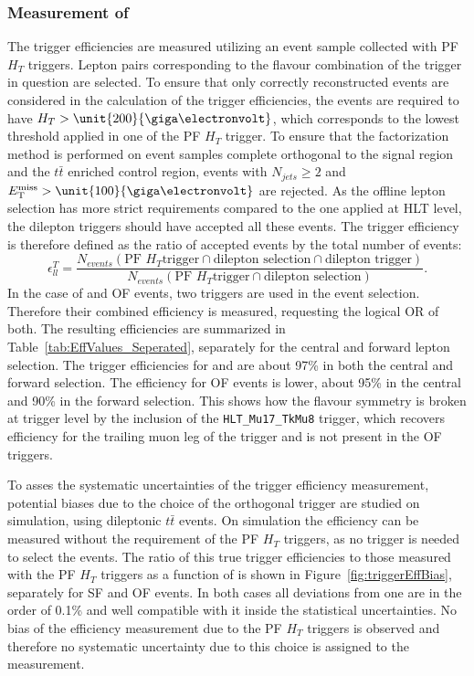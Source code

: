 \subsubsection{Measurement of \RT}
\label{sec:triggerEffs}
The trigger efficiencies are measured utilizing an event sample collected with PF $H_T$ triggers. Lepton pairs corresponding to the flavour combination of the trigger in question are selected. To ensure that only correctly reconstructed events are considered in the calculation of the trigger efficiencies, the events are required to have $H_T > \unit{200}{\giga\electronvolt}$, which corresponds to the lowest threshold applied in one of the PF $H_T$ trigger. To ensure that the factorization method is performed on event samples complete orthogonal to the signal region and the $t\bar{t}$ enriched control region, events with $N_{jets} \geq 2$ and $\MET > \unit{100}{\giga\electronvolt}$ are rejected. As the offline lepton selection has more strict requirements compared to the one applied at HLT level, the dilepton triggers should have accepted all these events. The trigger efficiency is therefore defined as the ratio of accepted events by the total number of events:
\begin{equation}
\epsilon_{ll}^T = \frac{N_{events}(\text{PF }H_T\text{trigger} \cap \text{dilepton selection} \cap \text{dilepton trigger})}{N_{events}(\text{PF }H_T\text{trigger} \cap \text{dilepton selection})}.
\end{equation}
In the case of \MM and OF events, two triggers are used in the event selection. Therefore their combined efficiency is measured, requesting the logical OR of both. The resulting efficiencies are summarized in Table~\ref{tab:EffValues_Seperated}, separately for the central and forward lepton selection. The trigger efficiencies for \EE and \MM are about 97\% in both the central and forward selection. The efficiency for OF events is lower, about 95\% in the central and 90\% in the forward selection. This shows how the flavour symmetry is broken at trigger level by the inclusion of the \verb+HLT_Mu17_TkMu8+ trigger, which recovers efficiency for the trailing muon leg of the trigger and is not present in the OF triggers.   

To asses the systematic uncertainties of the trigger efficiency measurement, potential biases due to the choice of the orthogonal trigger  are studied on simulation, using dileptonic $t\bar{t}$ events. On simulation the efficiency can be measured without the requirement of the PF $H_T$ triggers, as no trigger is needed to select the events. The ratio of this true trigger efficiencies to those measured with the PF $H_T$ triggers as a function of \mll is shown in Figure~\ref{fig:triggerEffBias}, separately for SF and OF events. In both cases all deviations from one are in the order of 0.1\% and well compatible with it inside the statistical uncertainties. No bias of the efficiency measurement due to the PF $H_T$ triggers is observed and therefore no systematic uncertainty due to this choice is assigned to the measurement.
